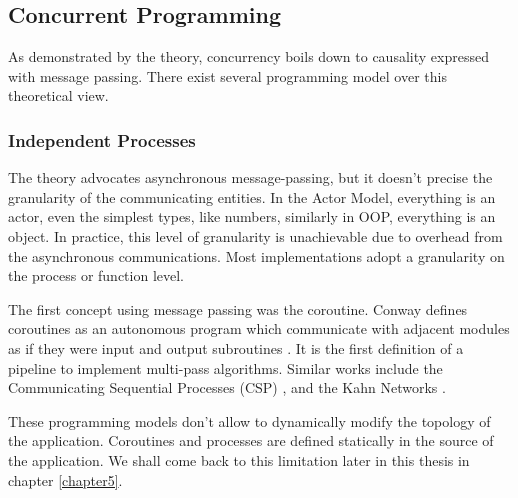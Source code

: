 \subsection{Concurrent Programming} \label{chapter3:concurrent-programming}

As demonstrated by the theory, concurrency boils down to causality expressed with message passing.
There exist several programming model over this theoretical view.

\subsubsection{Independent Processes}

The theory advocates asynchronous message-passing, but it doesn't precise the granularity of the communicating entities.
In the Actor Model, everything is an actor, even the simplest types, like numbers, similarly in OOP, everything is an object.
In practice, this level of granularity is unachievable due to overhead from the asynchronous communications.
Most implementations adopt a granularity on the process or function level.

The first concept using message passing was the coroutine.
Conway defines coroutines as an autonomous program which communicate with adjacent modules as if they were input and output subroutines \cite{Conway1963}.
It is the first definition of a pipeline to implement multi-pass algorithms.
Similar works include the Communicating Sequential Processes (CSP) \cite{Hoare1978, Brookes1984}, and the Kahn Networks \cite{Kahn1974, Kahn1976}.



These programming models don't allow to dynamically modify the topology of the application.
Coroutines and processes are defined statically in the source of the application.
We shall come back to this limitation later in this thesis in chapter \ref{chapter5}.

